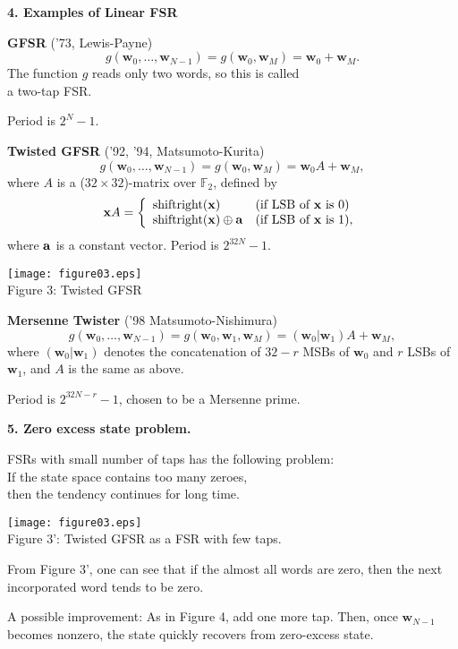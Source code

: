 \documentclass[a4j,12pt,landscape]{jarticle}
\def\F2{{\mathbb F}_2}
\def\bx{{{\mathbf x}}}
\def\bw{{{\mathbf w}}}
\begin{document}
\newpage
\noindent
{\bf 4. Examples of Linear FSR}

{\bf GFSR} ('73, Lewis-Payne)
$$
g(\bw_0,\ldots,\bw_{N-1}) = g(\bw_0, \bw_M) = \bw_0 + \bw_M.
$$
The function $g$ reads only two words, so this is called \\
a two-tap FSR.

Period is $2^N-1$.

\newpage
{\bf Twisted GFSR} ('92, '94, Matsumoto-Kurita)
$$
g(\bw_0,\ldots,\bw_{N-1}) = g(\bw_0, \bw_M) = \bw_0A + \bw_M,
$$
where $A$ is a ($32\times 32$)-matrix over $\F2$, defined by
$$
\bx A = 
\left\{\begin{array}{ll}
  \mbox{shiftright}({\bf x}) & (\mbox{if LSB of $\bx$ is 0}) \\
  \mbox{shiftright}({\bf x})\oplus{\bf a} & 
  (\mbox{if LSB of $\bx$ is 1}),
\end{array}\right.
$$
where ${\bf a}$ is a constant vector.
Period is $2^{32N}-1$. 
\begin{center}
\texttt{[image: figure03.eps]}
\\
Figure 3: Twisted GFSR
\end{center}
\newpage
{\bf Mersenne Twister} ('98 Matsumoto-Nishimura)
$$
g(\bw_0,\ldots,\bw_{N-1}) = g(\bw_0, \bw_1, \bw_M) = (\bw_0|\bw_1)A + \bw_M,
$$
where $(\bw_0|\bw_1)$ denotes
the concatenation of $32-r$ MSBs of $\bw_0$ and $r$ LSBs of $\bw_1$,
and $A$ is the same as above.

Period is $2^{32N-r}-1$, chosen to be a Mersenne prime.

\newpage
\noindent
{\bf 5. Zero excess state problem.}

FSRs with small number of taps has the following problem: \\
If the state space contains too many zeroes, \\
then the tendency continues for long time.
\begin{center}
\texttt{[image: figure03.eps]}
\\
\vskip -5mm
Figure 3': Twisted GFSR as a FSR with few taps.
\end{center}
 From Figure 3', one can see that if the almost 
all words are zero, then the next incorporated word
tends to be zero.



\newpage
A possible improvement: 
As in Figure 4, add one more tap.
Then, once $\bw_{N-1}$ becomes nonzero, the state
quickly recovers from zero-excess state.
\end{document}

